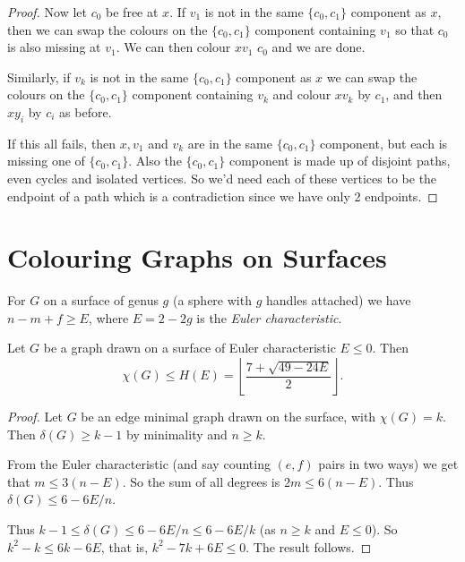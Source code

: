 \documentclass[a3paper, 10pt]{article}
\renewcommand{\vocab}[1]{\emph{#1}}
\begin{document}
\begin{multicols*}{5}
\begin{proof}
    Now let $c_0$ be free at $x$. If $v_1$ is not in the same $\{c_0, c_1\}$ component as $x$, then we can swap the colours on the $\{c_0, c_1\}$ component containing $v_1$ so that $c_0$ is also missing at $v_1$. We can then colour $x v_1$ $c_0$ and we are done. 

    Similarly, if $v_k$ is not in the same $\{c_0, c_1\}$ component as $x$ we can swap the colours on the $\{c_0, c_1\}$ component containing $v_k$ and colour $xv_k$ by $c_1$, and then $x y_i$ by $c_i$ as before.

    If this all fails, then $x, v_1$ and $v_k$ are in the same $\{c_0, c_1\}$ component, but each is missing one of $\{c_0, c_1\}$. Also the $\{c_0, c_1\}$ component is made up of disjoint paths, even cycles and isolated vertices. So we'd need each of these vertices to be the endpoint of a path which is a contradiction since we have only 2 endpoints.
\end{proof}

\section{Colouring Graphs on Surfaces}

\begin{fact}
    For $G$ on a surface of genus $g$ (a sphere with $g$ handles attached) we have $n - m + f \geq E$, where $E = 2 - 2g$ is the \vocab{Euler characteristic}.
\end{fact}

\begin{theorem}
    Let $G$ be a graph drawn on a surface of Euler characteristic $E \leq 0$. Then
    $$
    \chi(G) \leq H(E) = \left\lfloor\frac{7 + \sqrt{49 - 24E}}{2}\right\rfloor.
    $$
\end{theorem}
\begin{proof}
    Let $G$ be an edge minimal graph drawn on the surface, with $\chi(G) = k$.
    Then $\delta(G) \geq k - 1$ by minimality and $n \geq k$. 

    From the Euler characteristic (and say counting $(e, f)$ pairs in two ways) we get that $m \leq 3(n - E)$. So the sum of all degrees is $2m \leq 6(n - E)$. Thus $\delta(G) \leq 6 - 6E/n$.

    Thus $k - 1 \leq \delta(G) \leq 6 - 6E/n \leq 6 - 6E/k$ (as $n \geq k$ and $E \leq 0$). So $k^2 - k \leq 6k - 6E$, that is, $k^2 - 7k + 6E \leq 0$. The result follows. 
\end{proof}



\end{multicols*}
\end{document}
